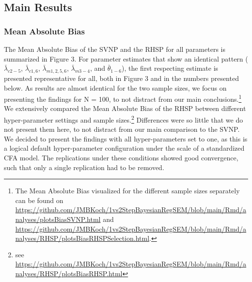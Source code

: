 \documentclass[
  man, donotrepeattitle,floatsintext]{apa6}
\begin{document}
\hypertarget{main-results}{%
\subsection{Main Results}\label{main-results}}

\hypertarget{mean-absolute-bias-1}{%
\subsubsection{Mean Absolute Bias}\label{mean-absolute-bias-1}}

The Mean Absolute Bias of the SVNP and the RHSP for all parameters is summarized in Figure 3. For parameter estimates that show an identical pattern (\(\bar{\lambda}_{c 2-5}\), \(\bar{\lambda}_{c 1, 6}\), \(\bar{\lambda}_{m 1, 2, 5, 6}\), \(\bar{\lambda}_{m 3-4}\), and \(\bar{\theta}_{1-6}\)), the first respecting estimate is presented representative for all, both in Figure 3 and in the numbers presented below. As results are almost identical for the two sample sizes, we focus on presenting the findings for N = 100, to not distract from our main conclusions.\footnote{The Mean Absolute Bias visualized for the different sample sizes separately can be found on \url{https://github.com/JMBKoch/1vs2StepBayesianRegSEM/blob/main/Rmd/analyses/plotsBiasSVNP.html} and \url{https://github.com/JMBKoch/1vs2StepBayesianRegSEM/blob/main/Rmd/analyses/RHSP/plotsBiasRHSPSelection.html}.} We extensively compared the Mean Absolute Bias of the RHSP between different hyper-parameter settings and sample sizes.\footnote{see \url{https://github.com/JMBKoch/1vs2StepBayesianRegSEM/blob/main/Rmd/analyses/RHSP/plotsBiasRHSP.html}} Differences were so little that we do not present them here, to not distract from our main comparison to the SVNP. We decided to present the findings with all hyper-parameters set to one, as this is a logical default hyper-parameter configuration under the scale of a standardized CFA model. The replications under these conditions showed good convergence, such that only a single replication had to be removed.
\end{document}
